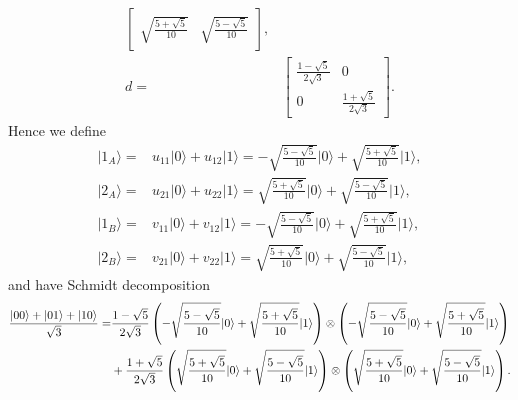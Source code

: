 \documentclass[en]{sol-man}
\begin{document}
\begin{pf}
\begin{align}
\begin{bmatrix}
            \sqrt{\frac{5+\sqrt{5}}{10}}&\sqrt{\frac{5-\sqrt{5}}{10}}
        \end{bmatrix},\\
        d=&\begin{bmatrix}
            \frac{1-\sqrt{5}}{2\sqrt{3}}&0\\
            0&\frac{1+\sqrt{5}}{2\sqrt{3}}
        \end{bmatrix}.
    \end{align}
    Hence we define
    \begin{align}
        \lvert 1_A\rangle=&u_{11}\lvert 0\rangle+u_{12}\lvert 1\rangle=-\sqrt{\frac{5-\sqrt{5}}{10}}\lvert 0\rangle+\sqrt{\frac{5+\sqrt{5}}{10}}\lvert 1\rangle,\\
        \lvert 2_A\rangle=&u_{21}\lvert 0\rangle+u_{22}\lvert 1\rangle=\sqrt{\frac{5+\sqrt{5}}{10}}\lvert 0\rangle+\sqrt{\frac{5-\sqrt{5}}{10}}\lvert 1\rangle,\\
        \lvert 1_B\rangle=&v_{11}\lvert 0\rangle+v_{12}\lvert 1\rangle=-\sqrt{\frac{5-\sqrt{5}}{10}}\lvert 0\rangle+\sqrt{\frac{5+\sqrt{5}}{10}}\lvert 1\rangle,\\
        \lvert 2_B\rangle=&v_{21}\lvert 0\rangle+v_{22}\lvert 1\rangle=\sqrt{\frac{5+\sqrt{5}}{10}}\lvert 0\rangle+\sqrt{\frac{5-\sqrt{5}}{10}}\lvert 1\rangle,
    \end{align}
    and have Schmidt decomposition
    \begin{align}
        \notag\frac{\lvert 00\rangle+\lvert 01\rangle+\lvert 10\rangle}{\sqrt{3}}=&\frac{1-\sqrt{5}}{2\sqrt{3}}\left(-\sqrt{\frac{5-\sqrt{5}}{10}}\lvert 0\rangle+\sqrt{\frac{5+\sqrt{5}}{10}}\lvert 1\rangle\right)\otimes\left(-\sqrt{\frac{5-\sqrt{5}}{10}}\lvert 0\rangle+\sqrt{\frac{5+\sqrt{5}}{10}}\lvert 1\rangle\right)\\
        &+\frac{1+\sqrt{5}}{2\sqrt{3}}\left(\sqrt{\frac{5+\sqrt{5}}{10}}\lvert 0\rangle+\sqrt{\frac{5-\sqrt{5}}{10}}\lvert 1\rangle\right)\otimes\left(\sqrt{\frac{5+\sqrt{5}}{10}}\lvert 0\rangle+\sqrt{\frac{5-\sqrt{5}}{10}}\lvert 1\rangle\right).
    \end{align}
\end{pf}
\end{document}
